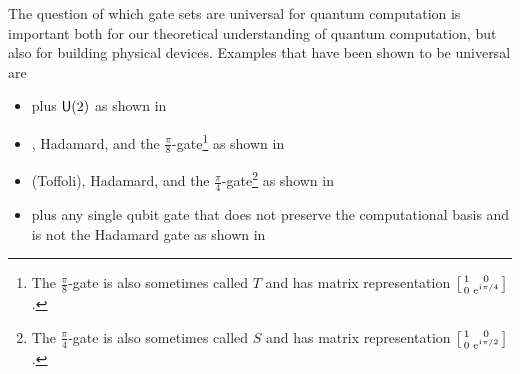 The question of which gate sets are universal for quantum computation is important both for our theoretical understanding of quantum computation, but also for building physical devices.
Examples that have been shown to be universal are
\begin{itemize}
    \item \CNOT{} plus $\mathsf{U} (2)$ as shown in~\cite{universal-cnot-u2}
    \item \CNOT{}, Hadamard, and the $\frac{\pi}{8}$-gate\footnote{The $\frac{\pi}{8}$-gate is also sometimes called $T$ and has matrix representation $\smqty[1 & 0 \\ 0 & \e^{\iu\pi/4}]$.} as shown in~\cite{universal-cnot-had-p8}
    \item \CCNOT{} (Toffoli), Hadamard, and the $\frac{\pi}{4}$-gate\footnote{The $\frac{\pi}{4}$-gate is also sometimes called $S$ and has matrix representation $\smqty[1 & 0 \\ 0 & \e^{\iu\pi/2}]$.} as shown in~\cite{universal-ccnot-had-p4}
    \item \CNOT{} plus any single qubit gate that does not preserve the computational basis and is not the Hadamard gate as shown in~\cite{universal-cnot-basis-change}
\end{itemize}


